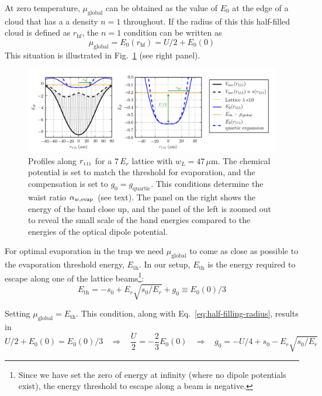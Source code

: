 At zero temperature, $\mu_{\text{global}}$  can be obtained as the value of
$E_{0}$ at the edge of a cloud that has a a density $n=1$ throughout.  If the
radius of this this half-filled cloud is defined as $r_{\text{hf}}$, the $n=1$
condition can be written as 
\begin{equation}
    \mu_{\text{global}} =  E_{0}(r_{\text{hf}}) = U/2 +  E_{0}(0) 
  \label{eq:half-filling-radius} 
\end{equation} 
This situation is illustrated in Fig.~\ref{fig:lattice_general-comp} (see right
panel).  
\begin{figure}
    \centering
\includegraphics[width=1.0\textwidth]{../figures/lda_evap/lattice_general-comp.png}
\caption{\small Profiles along $ r_{\text{\tiny{111}}} $ for a 7\,$E_{r}$ lattice with
$w_{L}=47\,\mu$m.  The chemical potential is set to match the threshold for
evaporation, and the compensation is set to $g_{0}=g_{\text{quartic}}$. This
conditions determine the waist ratio $ \alpha_{w,\text{evap}} $ (see text).  The panel on
the right shows the energy of the band close up, and the panel of the left is
zoomed out to reveal the small scale of the band energies compared to the
energies of the optical dipole potential. }
\label{fig:lattice_general-comp}
\end{figure}

For optimal evaporation in the trap we need $\mu_{\mathrm{global}}$ to come as
close as possible to the evaporation threshold energy, $E_{\text{th}}$.  In our
setup, $E_{\text{th}}$ is the energy required to escape along one of the
lattice beams\footnote{Since we have set the zero of energy at infinity (where
no dipole potentials exist), the energy threshold to escape along a beam is
negative.}: 
\begin{equation} 
  E_{\text{th}} =  -s_{0} + E_{r}\sqrt{s_{0}/E_{r}} + g_{0}  \equiv E_{0}(0)/3 
\end{equation}

Setting $\mu_{\text{global}} = E_{\text{th}} $.
This condition, along with Eq.~\ref{eq:half-filling-radius}, results in
\begin{equation}
   U/2 + E_{0}(0) =  E_{0}(0)/3
   \ \ \ \  \Rightarrow \ \ \ \ 
    \frac{U}{2} = -\frac{2}{3} E_{0}(0)  
   \ \ \ \  \Rightarrow \ \ \ \  
   g_{0} =  -U/4  + s_{0} -  E_{r}\sqrt{s_{0}/E_{r}}
  \label{eq:optimal-evap} 
\end{equation} 

